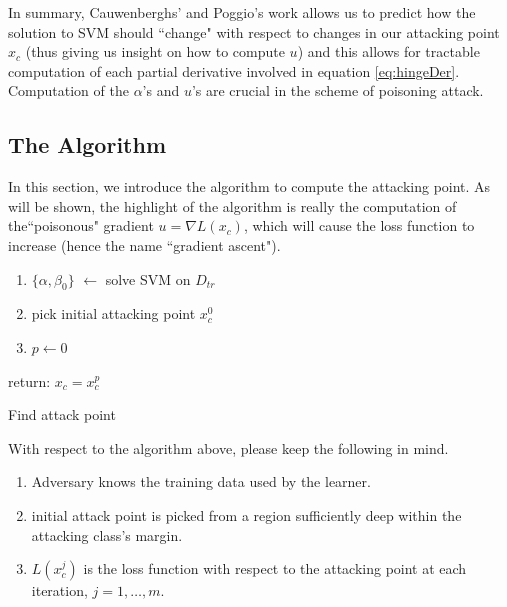 \documentclass[twoside]{article}
\begin{document}
In summary, Cauwenberghs' and Poggio's work allows us to predict how the solution to SVM should ``change" with respect to changes in our attacking point $x_{c}$ (thus giving us insight on how to compute $u$) and this allows for tractable computation of each partial derivative involved in equation \textcolor{blue}{\ref{eq:hingeDer}}. Computation of the $\alpha$'s and $u$'s are crucial in the scheme of poisoning attack. 
\subsection{The Algorithm}

In this section, we introduce the algorithm to compute the attacking point. As will be shown, the highlight of the algorithm is really the computation of the``poisonous" gradient $u = \nabla{L(x_{c})}$, which will cause the loss function to increase (hence the name ``gradient ascent").

\begin{algorithm}[H]
\SetAlgoLined
{}
\begin{enumerate}
    \item $\{\alpha, \beta_{0}\}$ $\longleftarrow$ solve SVM on $D_{tr}$
    \item pick initial attacking point $x_c^{0}$
    \item $p \longleftarrow 0$
\end{enumerate}

    return: $x_c = x_c^{p}$
    \caption{Find attack point}
    \end{algorithm}
With respect to the algorithm above, please keep the following in mind.
\begin{enumerate}
  \item Adversary knows the training data used by the learner.
  \item initial attack point is picked from a region sufficiently deep within the attacking class's margin.
  \item $L(x_c^{j})$ is the loss function with respect to the attacking point at each iteration, $j = 1, \dots, m$.
\end{enumerate}
\end{document}
